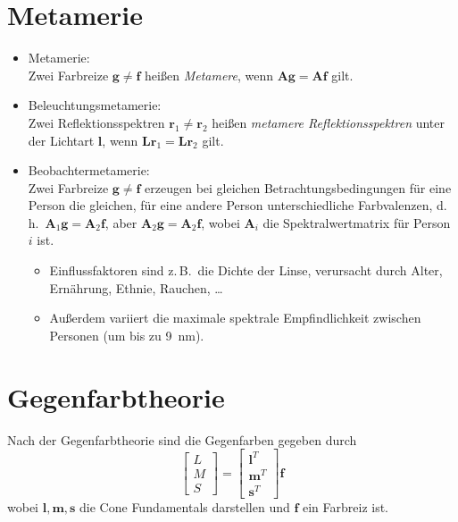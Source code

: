 \documentclass[a4paper, 11pt, accentcolor = tud3b]{tudreport}
\newcommand{\mat}[1]{\boldsymbol{#1}}
\renewcommand{\vec}[1]{\boldsymbol{\mathbf{#1}}}
\renewcommand{\dh}{d.\,h.~}
\newcommand{\zB}{z.\,B.~}
\begin{document}
		\section{Metamerie}
			\begin{itemize}
				\item Metamerie: \\ Zwei Farbreize \( \vec{g} \neq \vec{f} \) heißen \emph{Metamere}, wenn \( \mat{A} \vec{g} = \mat{A} \vec{f} \) gilt.
				\item Beleuchtungsmetamerie: \\ Zwei Reflektionsspektren \( \vec{r}_1 \neq \vec{r}_2 \) heißen \emph{metamere Reflektionsspektren} unter der Lichtart \( \vec{l} \), wenn \( \mat{L} \vec{r}_1 = \mat{L} \vec{r}_2 \) gilt.
				\item Beobachtermetamerie: \\ Zwei Farbreize \( \vec{g} \neq \vec{f} \) erzeugen bei gleichen Betrachtungsbedingungen für eine Person die gleichen, für eine andere Person unterschiedliche Farbvalenzen, \dh \( \mat{A}_1 \vec{g} = \mat{A}_2 \vec{f} \), aber \( \mat{A}_2 \vec{g} = \mat{A}_2 \vec{f} \), wobei \( \mat{A}_i \) die Spektralwertmatrix für Person \(i\) ist.
					\begin{itemize}
						\item Einflussfaktoren sind \zB die Dichte der Linse, verursacht durch Alter, Ernährung, Ethnie, Rauchen, \dots
						\item Außerdem variiert die maximale spektrale Empfindlichkeit zwischen Personen (um bis zu \SI{9}{\nano\meter}).
					\end{itemize}
			\end{itemize}

		\section{Gegenfarbtheorie}
			Nach der Gegenfarbtheorie sind die Gegenfarben gegeben durch
			\begin{equation*}
				\begin{bmatrix}
					L \\
					M \\
					S
				\end{bmatrix}
				=
				\begin{bmatrix}
					\vec{l}^T \\
					\vec{m}^T \\
					\vec{s}^T
				\end{bmatrix}
				\vec{f}
			\end{equation*}
			wobei \( \vec{l}, \vec{m}, \vec{s} \) die Cone Fundamentals darstellen und \(\vec{f}\) ein Farbreiz ist.
\end{document}
